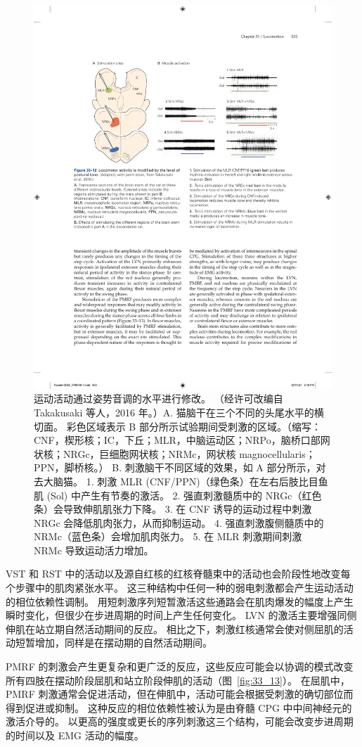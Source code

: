 \begin{figure}[htbp]
	\centering
	\includegraphics[width=0.8\linewidth]{chap33/fig_33_12}
	\caption{运动活动通过姿势音调的水平进行修改。 （经许可改编自 Takakusaki 等人，2016 年。）A. 猫脑干在三个不同的头尾水平的横切面。 彩色区域表示 B 部分所示试验期间受刺激的区域。（缩写：CNF，楔形核；IC，下丘；MLR，中脑运动区；NRPo，脑桥口部网状核；NRGc，巨细胞网状核；NRMc，网状核 magnocellularis；PPN，脚桥核。） B. 刺激脑干不同区域的效果，如 A 部分所示，对去大脑猫。 1. 刺激 MLR (CNF/PPN)（绿色条）在左右后肢比目鱼肌 (Sol) 中产生有节奏的激活。 2. 强直刺激髓质中的 NRGc（红色条）会导致伸肌肌张力下降。 3. 在 CNF 诱导的运动过程中刺激 NRGc 会降低肌肉张力，从而抑制运动。 4. 强直刺激腹侧髓质中的 NRMc（蓝色条）会增加肌肉张力。 5. 在 MLR 刺激期间刺激 NRMc 导致运动活力增加。}
	\label{fig:33_12}
\end{figure}


VST 和 RST 中的活动以及源自红核的红核脊髓束中的活动也会阶段性地改变每个步骤中的肌肉紧张水平。
这三种结构中任何一种的弱电刺激都会产生运动活动的相位依赖性调制。
用短刺激序列短暂激活这些通路会在肌肉爆发的幅度上产生瞬时变化，但很少在步进周期的时间上产生任何变化。
LVN 的激活主要增强同侧伸肌在站立期自然活动期间的反应。
相比之下，刺激红核通常会使对侧屈肌的活动短暂增加，同样是在摆动期的自然活动期间。


PMRF 的刺激会产生更复杂和更广泛的反应，这些反应可能会以协调的模式改变所有四肢在摆动阶段屈肌和站立阶段伸肌的活动（图~\ref{fig:33_13}）。
在屈肌中，PMRF 刺激通常会促进活动，但在伸肌中，活动可能会根据受刺激的确切部位而得到促进或抑制。
这种反应的相位依赖性被认为是由脊髓 CPG 中中间神经元的激活介导的。
以更高的强度或更长的序列刺激这三个结构，可能会改变步进周期的时间以及 EMG 活动的幅度。



